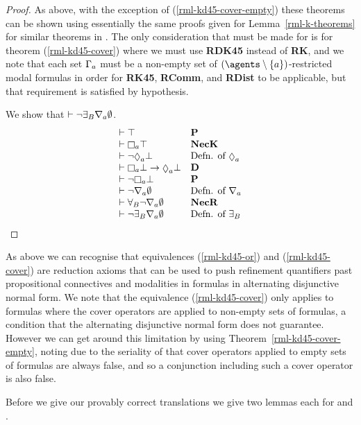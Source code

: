 \begin{proof}
As above, with the exception of (\ref{rml-kd45-cover-empty}) these theorems can be shown using essentially the same proofs given for Lemma~\ref{rml-k-theorems} for similar theorems in \axiomRmlK{}.
The only consideration that must be made for \axiomRmlKD{} is for theorem (\ref{rml-kd45-cover}) where we must use {\bf RDK45} instead of {\bf RK}, and we note that each set $\Gamma_a$ must be a non-empty set of $(\agents \setminus \{\agentA\})$-restricted modal formulas in order for {\bf RK45}, {\bf RComm}, and {\bf RDist} to be applicable, but that requirement is satisfied by hypothesis.

We show that $\vdash \lnot {\exists_{B}} \nabla_{a} \emptyset$.
$$
\begin{array}{ll}
    \proves \top & {\bf P}\\
    \proves \necessaryA \top & {\bf NecK}\\
    \proves \lnot \possibleA \bot & \text{Defn. of $\possibleA$}\\
    \proves \necessaryA \bot \implies \possibleA \bot & {\bf D}\\
    \proves \lnot \necessaryA \bot & {\bf P}\\
    \proves \lnot \coversA \emptyset & \text{Defn. of $\coversA$}\\
    \proves \allrefsBs \lnot \coversA \emptyset & {\bf NecR}\\
    \proves \lnot \somerefsBs \coversA \emptyset & \text{Defn. of $\somerefsBs$}
\end{array}
$$
\end{proof}

As above we can recognise that equivalences (\ref{rml-kd45-or}) and (\ref{rml-kd45-cover}) are reduction axioms that can be used to push refinement quantifiers past propositional connectives and modalities in formulas in alternating disjunctive normal form.
We note that the equivalence (\ref{rml-kd45-cover}) only applies to formulas where the cover operators are applied to non-empty sets of formulas, a condition that the alternating disjunctive normal form does not guarantee.
However we can get around this limitation by using Theorem~\ref{rml-kd45-cover-empty}, noting due to the seriality of \classKD{} that cover operators applied to empty sets of formulas are always false, and so a conjunction including such a cover operator is also false.

Before we give our provably correct translations we give two lemmas each for \axiomRmlKFF{} and \axiomRmlKD{}.


